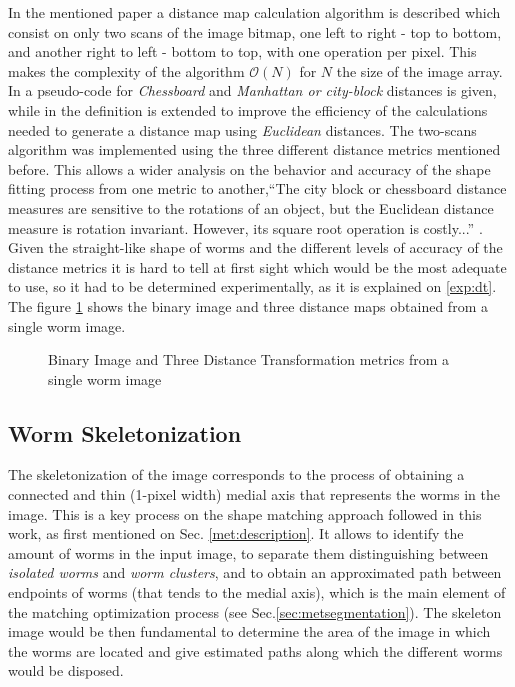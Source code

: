 In the mentioned paper a distance map calculation algorithm is described which consist
on only two scans of the image bitmap, one left to right - top to bottom, and another
right to left - bottom to top, with one operation per pixel. This makes the complexity
of the algorithm $\mathcal{O}(N)$ for $N$ the size of the image array.
In \cite[p.197]{fastdt} a pseudo-code for \emph{Chessboard} and 
\emph{Manhattan or city-block} distances is given, while in \cite[p.198]{fastdt} the 
definition is extended to improve the efficiency of the calculations needed to 
generate a distance map using \emph{Euclidean} distances.
The two-scans algorithm was implemented using the three different distance metrics
mentioned before. This allows a wider analysis on the behavior and accuracy of the shape 
fitting process from one metric to another,``The city block or chessboard distance
measures are sensitive to the rotations of an object, but the Euclidean distance
measure is rotation invariant. However, its square root operation is costly...''
\cite[p.332]{eucskeleton}. Given the straight-like shape of worms and the different levels
of accuracy of the distance metrics it is hard to tell at first sight which would be 
the most adequate to use, so it had to be determined experimentally, as it is explained
on \ref{exp:dt}.
The figure \ref{fig:distance} shows the binary image and three distance maps obtained 
from a single worm image.

\begin{figure}[h t b p ! H]
  \centering
\qquad
\qquad                
\qquad
  \caption{Binary Image and Three Distance Transformation metrics from a single worm image}
  \label{fig:distance}
\end{figure}


\subsection{Worm Skeletonization}
\label{sec:metsk}

The skeletonization of the image corresponds to the process of obtaining a 
connected and thin (1-pixel width) medial axis that represents the worms in the 
image. This is a key process on the shape matching
approach followed in this work, as first mentioned on Sec. \ref{met:description}.
It allows to identify the amount of worms in the input image, to separate them 
distinguishing between \emph{isolated worms} and \emph{worm clusters}, and to
obtain an approximated path between endpoints 
of worms (that tends to the medial axis), which is the main element of the 
matching optimization process (see Sec.\ref{sec:metsegmentation}). The skeleton
image would be then fundamental to determine the area of the image in which
the worms are located and give estimated paths along which the different
worms would be disposed. \\

